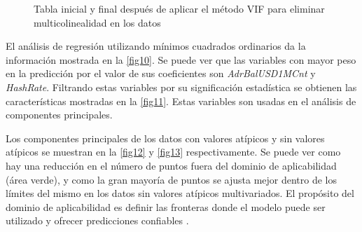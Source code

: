 \begin{figure}[!h]
	\centering
	\qquad
	\caption{Tabla inicial y final después de aplicar el método VIF para eliminar multicolinealidad en los datos}
	\label{fig8}
\end{figure}

El análisis de regresión utilizando mínimos cuadrados ordinarios da la información mostrada en la \autoref{fig10}. Se puede ver que las variables con mayor peso en la predicción por el valor de sus coeficientes son \textit{AdrBalUSD1MCnt} y \textit{HashRate}.
Filtrando estas variables por su significación estadística se obtienen las características mostradas en la \autoref{fig11}. Estas variables son usadas en el análisis de componentes principales.


Los componentes principales de los datos con valores atípicos y sin valores atípicos se muestran en la \autoref{fig12} y \autoref{fig13} respectivamente. Se puede ver como hay una reducción en el número de puntos fuera del dominio de aplicabilidad (área verde), y como la gran mayoría de puntos se ajusta mejor dentro de los límites del mismo en los datos sin valores atípicos multivariados. El propósito del dominio de aplicabilidad es definir las fronteras donde el modelo puede ser utilizado y ofrecer predicciones confiables \parencite{karApplicabilityDomainStep2018}.

